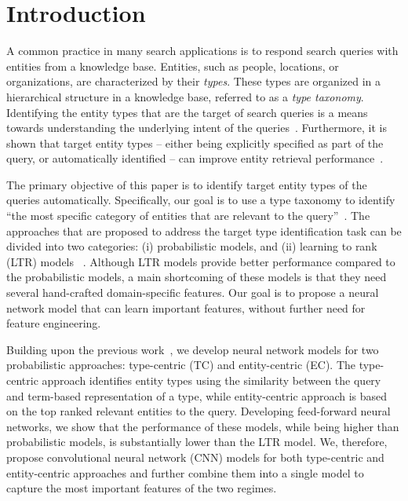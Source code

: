 \section{Introduction}\label{introduction}
\par
A common practice in many search applications is to respond search queries with entities from a knowledge base. Entities, such as people, locations, or organizations, are characterized by their \emph{types}. These types are organized in a hierarchical structure in a knowledge base, referred to as a \emph{type taxonomy}. 
Identifying the entity types that are the target of search queries is a means towards understanding the underlying intent of the queries~\citep{Balog:2018:EOS}.  Furthermore, it is shown that target entity types -- either being explicitly specified as part of the query, or automatically identified -- can improve entity retrieval performance~\citep{Garigliotti:2018:IET, Balog:2011:QME:2037661.2037667, Kaptein:2013:ECS:2405838.2405908, pehcevski2010entity}. 


The primary objective of this paper is to identify target entity types of the queries automatically. Specifically, our goal is to use a type taxonomy to identify ``the most specific category of entities that are relevant to the query''~\citep{Garigliotti:2017:TTI:3077136.3080659}.
The approaches that are proposed to address the target type identification task can be  divided into two categories: (i) probabilistic models, and (ii) learning to rank (LTR) models ~\citep{Garigliotti:2017:TTI:3077136.3080659, Garigliotti:2018:IET}. 	Although LTR models provide better performance compared to the probabilistic models, a main shortcoming of these models is that they need several hand-crafted domain-specific features. Our goal is to propose a neural network model that can learn important features, without further need for feature engineering.


Building upon the previous work~\citep{Garigliotti:2017:TTI:3077136.3080659}, we develop neural network models for two probabilistic approaches: type-centric (TC) and entity-centric (EC). The type-centric approach identifies entity types using the similarity between the query and term-based representation of a type, while entity-centric approach is based on the top ranked relevant entities to the query. Developing feed-forward neural networks, we show that the performance of these models, while being higher than probabilistic models, is substantially lower than the LTR model. We, therefore, propose convolutional neural network (CNN) models for  both type-centric and entity-centric approaches and further combine them into a single model to capture the most important features of the two regimes.


